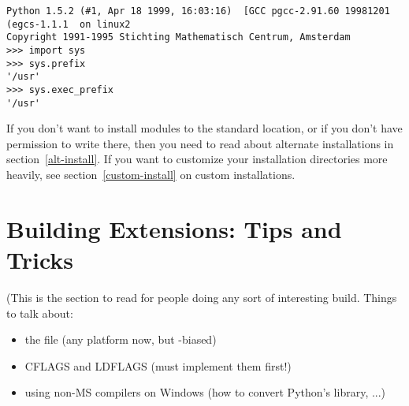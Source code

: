 \documentclass{howto}
\begin{document}
\begin{verbatim}
Python 1.5.2 (#1, Apr 18 1999, 16:03:16)  [GCC pgcc-2.91.60 19981201 (egcs-1.1.1  on linux2
Copyright 1991-1995 Stichting Mathematisch Centrum, Amsterdam
>>> import sys
>>> sys.prefix
'/usr'
>>> sys.exec_prefix
'/usr'
\end{verbatim}

If you don't want to install modules to the standard location, or if you
don't have permission to write there, then you need to read about
alternate installations in section~\ref{alt-install}.  If you want to
customize your installation directories more heavily, see
section~\ref{custom-install} on custom installations.



\newcommand{\installscheme}[8]
  {\begin{tableiii}{lll}{textrm}
          {Type of file}
          {Installation Directory}
          {Override option}
     \lineiii{pure module distribution}
             {\filevar{#1}\filenq{#2}}
             {\longprogramopt{install-purelib}}
     \lineiii{non-pure module distribution}
             {\filevar{#3}\filenq{#4}}
             {\longprogramopt{install-platlib}}
     \lineiii{scripts}
             {\filevar{#5}\filenq{#6}}
             {\longprogramopt{install-scripts}}
     \lineiii{data}
             {\filevar{#7}\filenq{#8}}
             {\longprogramopt{install-data}}
   \end{tableiii}}


\section{Building Extensions: Tips and Tricks}
\label{building-ext}

(This is the section to read for people doing any sort of interesting
build.  Things to talk about:
\begin{itemize}
\item the  file (any platform now, but \UNIX-biased)
\item CFLAGS and LDFLAGS (must implement them first!)
\item using non-MS compilers on Windows (how to convert
  Python's library, ...)  
\end{itemize}
\end{document}
